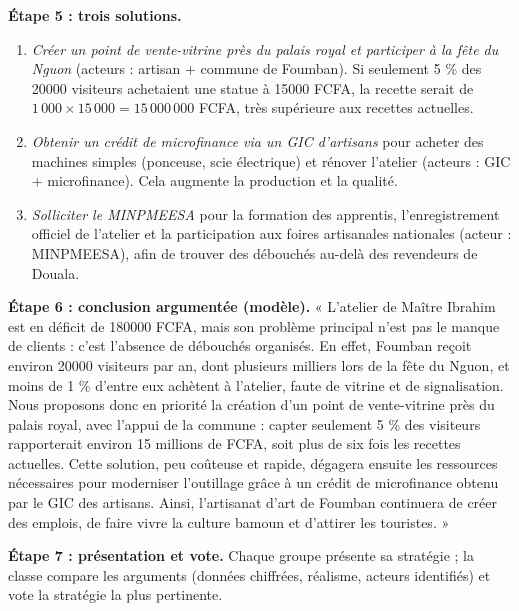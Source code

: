 \documentclass[11pt]{article}
\newcounter{popsec}
\newcounter{popsub}
\newcommand{\courssub}[1]{%
  \stepcounter{popsub}%
  \par\vspace{9pt}\noindent{\popxbold\fontsize{11.5}{13}\selectfont\color{popink}{\color{poporange}\thepopsec.\thepopsub}\hspace{6pt}#1}\par\nopagebreak\vspace{4pt}
}
\begin{document}
\begin{exoresolu}
\textbf{Étape 5 : trois solutions.}
\begin{enumerate}
\item \emph{Créer un point de vente-vitrine près du palais royal et participer à la fête du Nguon} (acteurs : artisan + commune de Foumban). Si seulement 5 \% des \num{20000} visiteurs achetaient une statue à \num{15000} FCFA, la recette serait de $1\,000 \times 15\,000 = 15\,000\,000$ FCFA, très supérieure aux recettes actuelles.
\item \emph{Obtenir un crédit de microfinance via un GIC d'artisans} pour acheter des machines simples (ponceuse, scie électrique) et rénover l'atelier (acteurs : GIC + microfinance). Cela augmente la production et la qualité.
\item \emph{Solliciter le MINPMEESA} pour la formation des apprentis, l'enregistrement officiel de l'atelier et la participation aux foires artisanales nationales (acteur : MINPMEESA), afin de trouver des débouchés au-delà des revendeurs de Douala.
\end{enumerate}

\textbf{Étape 6 : conclusion argumentée (modèle).} « L'atelier de Maître Ibrahim est en déficit de \num{180000} FCFA, mais son problème principal n'est pas le manque de clients : c'est l'absence de débouchés organisés. En effet, Foumban reçoit environ \num{20000} visiteurs par an, dont plusieurs milliers lors de la fête du Nguon, et moins de 1 \% d'entre eux achètent à l'atelier, faute de vitrine et de signalisation. Nous proposons donc en priorité la création d'un point de vente-vitrine près du palais royal, avec l'appui de la commune : capter seulement 5 \% des visiteurs rapporterait environ 15 millions de FCFA, soit plus de six fois les recettes actuelles. Cette solution, peu coûteuse et rapide, dégagera ensuite les ressources nécessaires pour moderniser l'outillage grâce à un crédit de microfinance obtenu par le GIC des artisans. Ainsi, l'artisanat d'art de Foumban continuera de créer des emplois, de faire vivre la culture bamoun et d'attirer les touristes. »

\textbf{Étape 7 : présentation et vote.} Chaque groupe présente sa stratégie ; la classe compare les arguments (données chiffrées, réalisme, acteurs identifiés) et vote la stratégie la plus pertinente.
\end{exoresolu}

\courssub{Bilan de l'activité}
\end{document}
